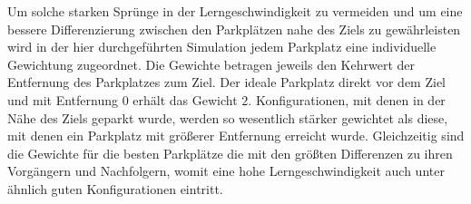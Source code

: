 Um solche starken Sprünge in der Lerngeschwindigkeit zu vermeiden und um eine bessere Differenzierung zwischen den Parkplätzen nahe des Ziels zu gewährleisten wird in der hier durchgeführten Simulation jedem Parkplatz eine individuelle Gewichtung zugeordnet. Die Gewichte betragen jeweils den Kehrwert der Entfernung des Parkplatzes zum Ziel. Der ideale Parkplatz direkt vor dem Ziel und mit Entfernung $0$ erhält das Gewicht $2$. Konfigurationen, mit denen in der Nähe des Ziels geparkt wurde, werden so wesentlich stärker gewichtet als diese, mit denen ein Parkplatz mit größerer Entfernung erreicht wurde. Gleichzeitig sind die Gewichte für die besten Parkplätze die mit den größten Differenzen zu ihren Vorgängern und Nachfolgern, womit eine hohe Lerngeschwindigkeit auch unter ähnlich guten Konfigurationen eintritt. 
